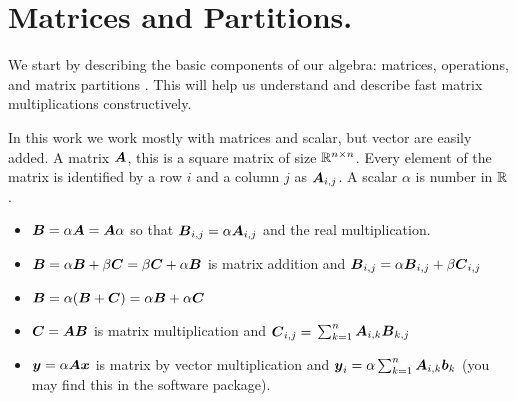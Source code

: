 \documentclass[acmsmall]{acmart}
\begin{document}
\section{Matrices and Partitions.}
We start by describing the basic components of our algebra: matrices,
operations, and matrix partitions . This will help us understand and
describe fast matrix multiplications constructively.

In this work we work mostly with matrices and scalar, but vector are
easily added. A matrix ${\boldsymbol A}$, this is a square matrix of size
$\mathbb{R}^{n\times n}$. Every element of the matrix is identified by a row
$i$ and a column $j$ as ${\boldsymbol A}_{i,j}$. A scalar $\alpha$ is number in
$\mathbb{R}$.
\begin{itemize}
  \item ${\boldsymbol B} = \alpha{\boldsymbol A} = {\boldsymbol A}\alpha$ so that ${\boldsymbol B}_{i,j}
    = \alpha{\boldsymbol A}_{i,j}$ and the real multiplication.
  \item ${\boldsymbol B} = \alpha{\boldsymbol B} + \beta{\boldsymbol C}= \beta{\boldsymbol C} +
    \alpha{\boldsymbol B}$ is matrix addition and ${\boldsymbol B}_{i,j} =
    \alpha{\boldsymbol B}_{i,j} + \beta{\boldsymbol C}_{i,j}$
  \item ${\boldsymbol B} = \alpha({\boldsymbol B} + {\boldsymbol C}) = \alpha{\boldsymbol B} +
    \alpha{\boldsymbol C}$
  \item ${\boldsymbol C}= {\boldsymbol A}{\boldsymbol B}$ is matrix multiplication and ${\boldsymbol C}_{i,j}=$ 
    $\sum_{k=1}^n {\boldsymbol A}_{i,k}{\boldsymbol B}_{k,j}$
  \item ${\boldsymbol y}= \alpha{\boldsymbol A}{\boldsymbol x}$ is matrix by vector
    multiplication and ${\boldsymbol y}_{i}=\alpha \sum_{k=1}^n
    {\boldsymbol A}_{i,k}{\boldsymbol b}_{k}$ (you may find this in the software
    package).
\end{itemize}
\end{document}
